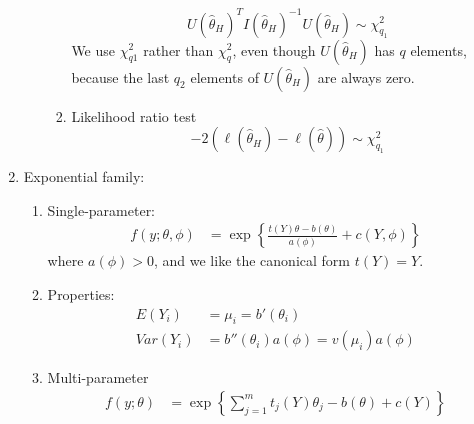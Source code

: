 \message{ !name(biostat651_summary.tex)}\documentclass{amsart}
\begin{document}
\begin{enumerate}
\begin{enumerate}
\begin{enumerate}
      \begin{equation*}
        U(\hat{\theta}_H)^T I(\hat{\theta}_H)^{-1} U(\hat{\theta}_H)
        \sim \chi^2_{q_1}
      \end{equation*}
      We use $\chi^2_{q1}$ rather than $\chi^2_q$, even though
      $U(\hat{\theta}_H)$ has $q$ elements, because the last $q_2$
      elements of $U(\hat{\theta}_H)$ are always zero.
    \item Likelihood ratio test
      \begin{equation*}
        -2(\ell(\hat{\theta}_H) - \ell(\hat{\theta})) \sim \chi^2_{q_1}
      \end{equation*}
    \end{enumerate}
  \end{enumerate}
\item Exponential family:
  \begin{enumerate}
  \item Single-parameter:
    \begin{align*}
      f(y; \theta, \phi) & = \exp\left\{\frac{t(Y)\theta - b(\theta)}{a(\phi)} + c(Y, \phi)\right\} 
    \end{align*}
    where $a(\phi) > 0$, and we like the canonical form $t(Y) = Y$.
  \item Properties:
    \begin{align*}
      E(Y_i) & = \mu_i = b'(\theta_i) \\
      Var(Y_i) & = b''(\theta_i) a(\phi) = v(\mu_i) a(\phi) 
    \end{align*}
  \item Multi-parameter
    \begin{align*}
      f(y; \theta) & = \exp\left\{\sum_{j=1}^m t_j(Y)\theta_j - b(\theta) + c(Y)\right\} 
    \end{align*}


\end{enumerate}
\end{enumerate}
\end{document}
